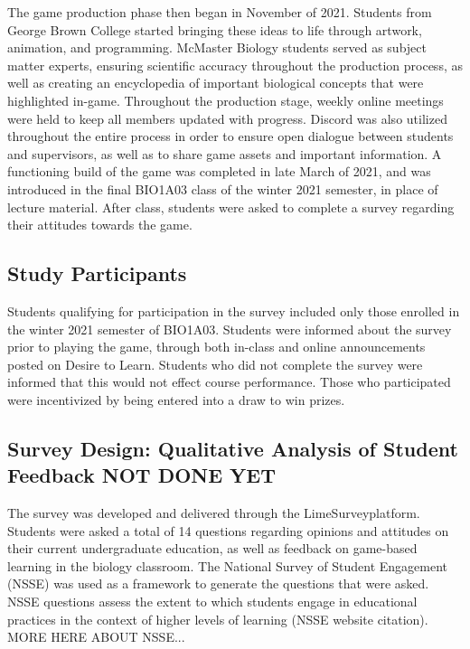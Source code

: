 \documentclass[10pt]{article}
\begin{document}
The game production phase then began in November of 2021. Students from George Brown College started bringing these ideas to life through artwork, animation, and programming. McMaster Biology students served as subject matter experts, ensuring scientific accuracy throughout the production process, as well as creating an encyclopedia of important biological concepts that were highlighted in-game. Throughout the production stage, weekly online meetings were held to keep all members updated with progress. Discord was also utilized throughout the entire process in order to ensure open dialogue between students and supervisors, as well as to share game assets and important information. A functioning build of the game was completed in late March of 2021, and was introduced in the final BIO1A03 class of the winter 2021 semester, in place of lecture material. After class, students were asked to complete a survey regarding their attitudes towards the game.

\subsection{Study Participants}

Students qualifying for participation in the survey included only those enrolled in the winter 2021 semester of BIO1A03. Students were informed about the survey prior to playing the game, through both in-class and online announcements posted on Desire to Learn. Students who did not complete the survey were informed that this would not effect course performance. Those who participated were incentivized by being entered into a draw to win prizes.

\subsection{Survey Design: Qualitative Analysis of Student Feedback NOT DONE YET}

The survey was developed and delivered through the LimeSurvey\textregistered \space platform. Students were asked a total of 14 questions regarding opinions and attitudes on their current undergraduate education, as well as feedback on game-based learning in the biology classroom. The National Survey of Student Engagement (NSSE) was used as a framework to generate the questions that were asked. NSSE questions assess the extent to which students engage in educational practices in the context of higher levels of learning (NSSE website citation). MORE HERE ABOUT NSSE...
\newpage
\end{document}
